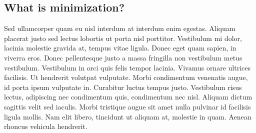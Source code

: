 
\subsection{What is minimization?}

Sed ullamcorper quam eu nisl interdum at interdum enim egestas. Aliquam placerat justo sed lectus lobortis ut porta nisl porttitor. Vestibulum mi dolor, lacinia molestie gravida at, tempus vitae ligula. Donec eget quam sapien, in viverra eros. Donec pellentesque justo a massa fringilla non vestibulum metus vestibulum. Vestibulum in orci quis felis tempor lacinia. Vivamus ornare ultrices facilisis. Ut hendrerit volutpat vulputate. Morbi condimentum venenatis augue, id porta ipsum vulputate in. Curabitur luctus tempus justo. Vestibulum risus lectus, adipiscing nec condimentum quis, condimentum nec nisl. Aliquam dictum sagittis velit sed iaculis. Morbi tristique augue sit amet nulla pulvinar id facilisis ligula mollis. Nam elit libero, tincidunt ut aliquam at, molestie in quam. Aenean rhoncus vehicula hendrerit.